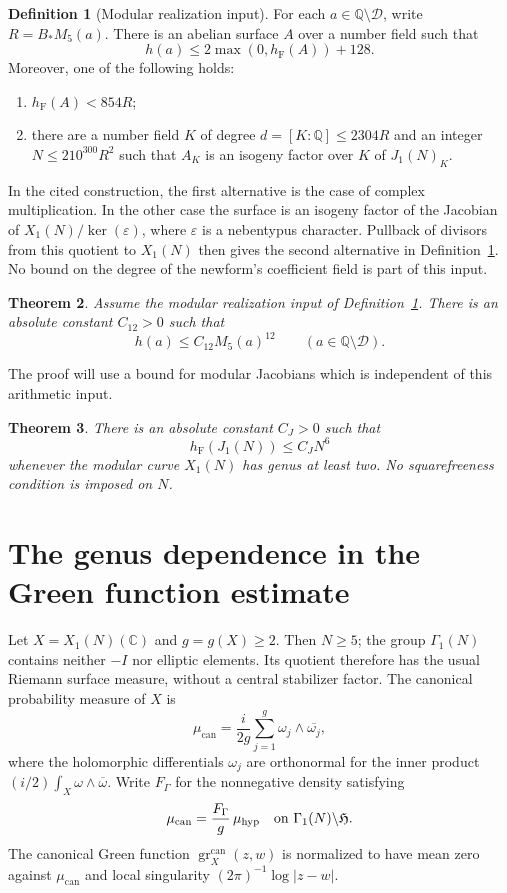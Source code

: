 \documentclass[11pt,a4paper]{article}
\newtheorem{theorem}{Theorem}[section]
\theoremstyle{definition}
\newtheorem{definition}[theorem]{Definition}
\newcommand{\Q}{\mathbb Q}
\newcommand{\C}{\mathbb C}
\newcommand{\hF}{h_{\mathrm F}}
\newcommand{\gr}{\operatorname{gr}^{\mathrm{can}}}
\begin{document}
\begin{definition}[Modular realization input]\label{def:input}
For each $a\in\Q\setminus\mathcal D$, write
$R=B_*M_5(a)$. There is an abelian surface $A$ over a number field
such that
\begin{equation}\label{eq:geometric-comparison}
 h(a)\le2\max(0,\hF(A))+128.
\end{equation}
Moreover, one of the following holds:
\begin{enumerate}
\item $\hF(A)<854R$;
\item there are a number field $K$ of degree $d=[K:\Q]\le2304R$
and an integer $N\le210^{300}R^2$ such that $A_K$ is an
isogeny factor over $K$ of $J_1(N)_K$.
\end{enumerate}
\end{definition}

In the cited construction, the first alternative is the case of
complex multiplication. In the other case the surface is an
isogeny factor of the Jacobian of
$X_1(N)/\ker(\varepsilon)$, where $\varepsilon$ is a nebentypus
character. Pullback of divisors from this quotient to $X_1(N)$
then gives the second alternative in Definition~\ref{def:input}.
No bound on the degree of the newform's coefficient field is part of
this input.

\begin{theorem}\label{thm:contact-height}
Assume the modular realization input of Definition~\ref{def:input}.
There is an absolute constant $C_{12}>0$ such that
\[
 h(a)\le C_{12}M_5(a)^{12}
 \qquad(a\in\Q\setminus\mathcal D).
\]
\end{theorem}

The proof will use a bound for modular Jacobians which is independent
of this arithmetic input.

\begin{theorem}\label{thm:jacobian}
There is an absolute constant $C_J>0$ such that
\[
 \hF(J_1(N))\le C_JN^6
\]
whenever the modular curve $X_1(N)$ has genus at least two.
No squarefreeness condition is imposed on $N$.
\end{theorem}

\section{The genus dependence in the Green function estimate}

Let $X=X_1(N)(\C)$ and $g=g(X)\ge2$.
Then $N\ge5$; the group $\Gamma_1(N)$ contains neither $-I$
nor elliptic elements. Its quotient therefore has the usual
Riemann surface measure, without a central stabilizer factor.
The canonical probability measure of $X$ is
\[
 \mu_{\mathrm{can}}=
 \frac{i}{2g}\sum_{j=1}^g\omega_j\wedge\overline{\omega_j},
\]
where the holomorphic differentials $\omega_j$ are orthonormal
for the inner product $(i/2)\int_X\omega\wedge\overline\omega$.
Write $F_\Gamma$ for the nonnegative density satisfying
\[
 \mu_{\mathrm{can}}=\frac{F_\Gamma}{g}\,\mu_{\mathrm{hyp}}
 \quad\hbox{on }\Gamma_1(N)\backslash\mathfrak H.
\]
The canonical Green function $\gr_X(z,w)$ is normalized to have
mean zero against $\mu_{\mathrm{can}}$ and local singularity
$(2\pi)^{-1}\log|z-w|$.
\end{document}
